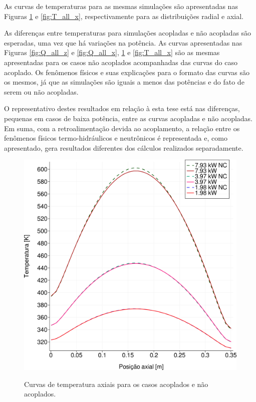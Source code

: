 As curvas de temperaturas para as mesmas simulações são apresentadas nas
Figuras \ref{fig:T_all_z} e \ref{fig:T_all_x}, respectivamente para as
distribuições radial e axial.

As diferenças entre temperaturas para simulações acopladas e não acopladas são
esperadas, uma vez que há variações na potência. As curvas apresentadas nas Figuras
\ref{fig:Q_all_z} e \ref{fig:Q_all_x}, \ref{fig:T_all_z} e \ref{fig:T_all_x} são
as mesmas apresentadas para os casos não acoplados acompanhadas das curvas do
caso acoplado. Os fenômenos físicos e suas explicações para o formato das curvas
são os mesmos, já que as simulações são iguais a menos das potências e do fato
de serem ou não acopladas.

O representativo destes resultados em relação à esta tese está nas diferenças,
pequenas em casos de baixa potência, entre as curvas acopladas e não acopladas.
Em suma, com a retroalimentação devida ao acoplamento, a relação entre os fenômenos
físicos termo-hidráulicos e neutrônicos é representada e, como apresentado,
gera resultados diferentes dos cálculos realizados separadamente.

\begin{figure}[htb]
  \caption{Curvas de temperatura axiais para os casos acoplados e não acoplados.}
  \centering\includegraphics[scale=0.5]{figuras/T_z_all_square_port.png}
  \label{fig:T_all_z}
\end{figure}

